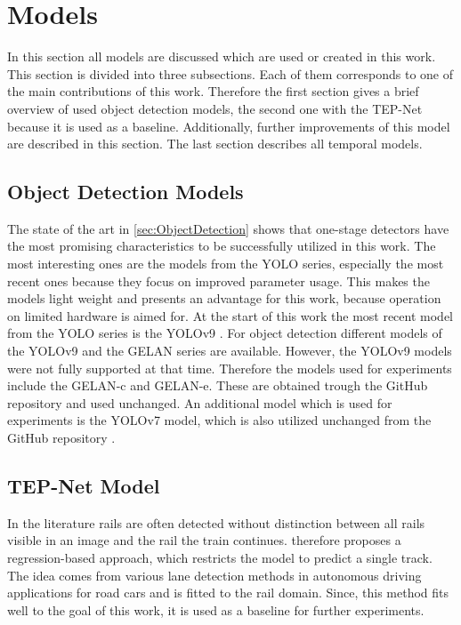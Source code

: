 \section{Models}
\label{sec:usedModels}

In this section all models are discussed which are used or created in this work.
This section is divided into three subsections.
Each of them corresponds to one of the main contributions of this work.
Therefore the first section gives a brief overview of used object detection models, the second one with the \ac{TEP}-Net \cite{tepNet2024} because it is used as a baseline.
Additionally, further improvements of this model are described in this section.
The last section describes all temporal models.

\subsection{Object Detection Models}

The state of the art in \autoref{sec:ObjectDetection} shows that one-stage detectors have the most promising characteristics to be successfully utilized in this work.
The most interesting ones are the models from the \ac{YOLO} series, especially the most recent ones because they focus on improved parameter usage.
This makes the models light weight and presents an advantage for this work, because operation on limited hardware is aimed for.
At the start of this work the most recent model from the \ac{YOLO} series is the \ac{YOLO}v9 \cite{YOLOv9}.
For object detection different models of the \ac{YOLO}v9 and the \ac{GELAN} series are available.
However, the \ac{YOLO}v9 models were not fully supported at that time.
Therefore the models used for experiments include the \ac{GELAN}-c and \ac{GELAN}-e.
These are obtained trough the GitHub repository \cite{YOLOv9GitHub} and used unchanged.
An additional model which is used for experiments is the \ac{YOLO}v7 \cite{yolov7} model, which is also utilized unchanged from the GitHub repository \cite{YOLOv7GitHub}.

\subsection{TEP-Net Model}
\label{subsec:baselineModel}

In the literature rails are often detected without distinction between all rails visible in an image and the rail the train continues.
\cite{tepNet2024} therefore proposes a regression-based approach, which restricts the model to predict a single track.
The idea comes from various lane detection methods in autonomous driving applications for road cars and is fitted to the rail domain.
Since, this method fits well to the goal of this work, it is used as a baseline for further experiments.

